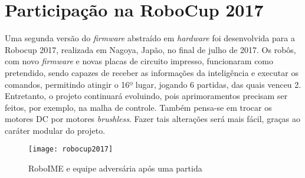 \chapter{Participação na RoboCup 2017}\label{cap:robocup_2017}

Uma segunda versão do \textit{firmware} abstraído em \textit{hardware} foi desenvolvida para a Robocup 2017, realizada em Nagoya, Japão, no final de julho de  2017. Os robôs, com novo \textit{firmware} e novas placas de circuito impresso, funcionaram como pretendido, sendo capazes de receber as informações da inteligência e executar os comandos, permitindo atingir o 16º lugar, jogando 6 partidas, das quais venceu 2.
Entretanto, o projeto continuará evoluindo, pois aprimoramentos precisam ser feitos, por exemplo, na malha de controle. Também pensa-se em trocar os motores DC por motores \textit{brushless}. Fazer tais alterações será mais fácil, graças ao caráter modular do projeto.

\begin{figure}
	\centering
	\texttt{[image: robocup2017]}
	\caption{RoboIME e equipe adversária após uma partida}
	\label{fig:robocup_2017}
\end{figure}



